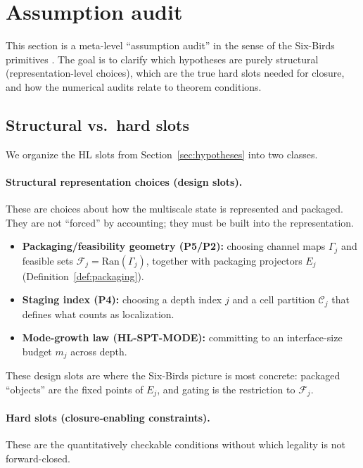 \documentclass[11pt]{article}
\newcommand{\Ran}{\mathrm{Ran}}
\begin{document}
 \section{Assumption audit}\label{sec:assumption-audit}

This section is a meta-level ``assumption audit'' in the sense of the Six-Birds primitives \cite{Tsiokos2026SixBirds}.
The goal is to clarify which hypotheses are purely structural (representation-level choices), which are the true hard slots needed for closure, and how the numerical audits relate to theorem conditions.

\subsection{Structural vs.\ hard slots}

We organize the HL slots from Section~\ref{sec:hypotheses} into two classes.

\paragraph{Structural representation choices (design slots).}
These are choices about how the multiscale state is represented and packaged.
They are not ``forced'' by accounting; they must be built into the representation.

\begin{itemize}
\item \textbf{Packaging/feasibility geometry (P5/P2):} choosing channel maps $\Gamma_j$ and feasible sets $\mathcal{F}_j=\Ran(\Gamma_j)$, together with packaging projectors $E_j$ (Definition~\ref{def:packaging}).
\item \textbf{Staging index (P4):} choosing a depth index $j$ and a cell partition $\mathcal{C}_j$ that defines what counts as localization.
\item \textbf{Mode-growth law (HL-SPT-MODE):} committing to an interface-size budget $m_j$ across depth.
\end{itemize}

These design slots are where the Six-Birds picture is most concrete: packaged ``objects'' are the fixed points of $E_j$, and gating is the restriction to $\mathcal{F}_j$.

\paragraph{Hard slots (closure-enabling constraints).}
These are the quantitatively checkable conditions without which legality is not forward-closed.
\end{document}
